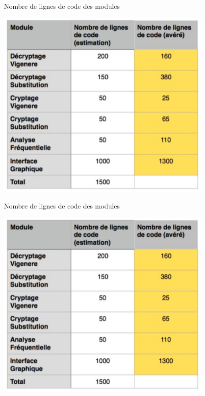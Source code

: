 \documentclass[10pt,xcolor=table]{beamer}
\begin{document}
\begin{frame}
	\begin{block}{Nombre de lignes de code des modules}
	\begin{center}
		\includegraphics[scale =0.3]{tabl.png} \\ 
	\end{center}
	\end{block}
\end{frame}
\begin{frame}
	\begin{block}{Nombre de lignes de code des modules}
	\begin{center}
		\includegraphics[scale =0.3]{tabl.png} \\ 
	\end{center}
	\end{block}
\end{frame}
\end{document}
